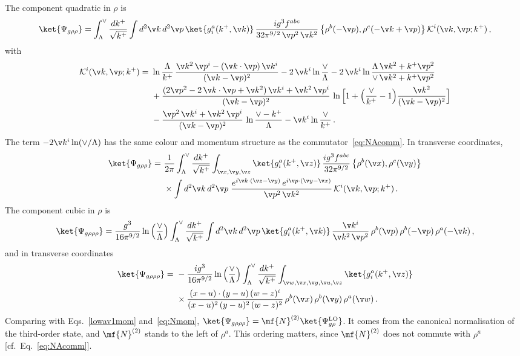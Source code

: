 The component quadratic in $\rho$ is
\begin{align}\label{grhorhomom}
\ket{\Psi_{g\rho\rho}} =\int_{\Lambda}^{\vee}\frac{dk^{+}}{\sqrt{k^{+}}}\int d^{2}\v k\,d^{2}\v p\,\ket{g^{a}_{i}(k^{+},\v k)}\,
\frac{ig^{3}f^{abc}}{32\pi^{9/2}\,\v p^{2}\,\v k^{2}}\,\big\{\rho^{b}(-\v p),\rho^{c}(-\v k+\v p)\big\}\,
\mathcal{K}^{i}(\v k,\v p;k^{+})\,,
\end{align}
with
\begin{align}\label{grhorhokernel}
\mathcal{K}^{i}(\v k,\v p;k^{+})=\ &\ln\frac{\Lambda}{k^{+}}\,\frac{\v k^{2}\,\v p^{i}-(\v k\cdot\v p)\,\v k^{i}}{(\v k-\v p)^{2}}
-2\,\v k^{i}\ln\frac{\vee}{\Lambda}-2\,\v k^{i}\ln\frac{\Lambda\,\v k^{2}+k^{+}\v p^{2}}{\vee\,\v k^{2}+k^{+}\v p^{2}}\notag\\
&+\frac{(2\v p^{2}-2\,\v k\cdot\v p+\v k^{2})\,\v k^{i}+\v k^{2}\,\v p^{i}}{(\v k-\v p)^{2}}\,
\ln\Big[1+\Big(\frac{\vee}{k^{+}}-1\Big)\frac{\v k^{2}}{(\v k-\v p)^{2}}\Big]\notag\\
&-\frac{\v p^{2}\,\v k^{i}+\v k^{2}\,\v p^{i}}{(\v k-\v p)^{2}}\,\ln\frac{\vee-k^{+}}{\Lambda}-\v k^{i}\ln\frac{\vee}{k^{+}}\,.
\end{align}
The term $-2\v k^{i}\ln(\vee/\Lambda)$ has the same colour and momentum structure as the
commutator~\eqref{eq:NAcomm}. In transverse coordinates,
\begin{align}\label{grhorhopos}
\ket{\Psi_{g\rho\rho}} =\ &\frac{1}{2\pi}\int_{\Lambda}^{\vee}\frac{dk^{+}}{\sqrt{k^{+}}}\int_{\v x,\v y,\v z}
\ket{g^{a}_{i}(k^{+},\v z)}\,\frac{ig^{3}f^{abc}}{32\pi^{9/2}}\,\big\{\rho^{b}(\v x),\rho^{c}(\v y)\big\}\notag\\
&\times\int d^{2}\v k\,d^{2}\v p\;\frac{e^{i\v k\cdot(\v z-\v y)}\,e^{i\v p\cdot(\v y-\v x)}}{\v p^{2}\,\v k^{2}}\,
\mathcal{K}^{i}(\v k,\v p;k^{+})\,.
\end{align}
The component cubic in $\rho$ is
\begin{align}\label{3rhosmom}
\ket{\Psi_{g\rho\rho\rho}} =\frac{g^{3}}{16\pi^{9/2}}\ln\Big(\frac{\vee}{\Lambda}\Big)\int_{\Lambda}^{\vee}\frac{dk^{+}}{\sqrt{k^{+}}}
\int d^{2}\v k\,d^{2}\v p\,\ket{g^{a}_{i}(k^{+},\v k)}\,\frac{\v k^{i}}{\v k^{2}\,\v p^{2}}\,
\rho^{b}(\v p)\,\rho^{b}(-\v p)\,\rho^{a}(-\v k)\,,
\end{align}
and in transverse coordinates
\begin{align}\label{3rhospos}
\ket{\Psi_{g\rho\rho\rho}} =\ &-\frac{ig^{3}}{16\pi^{9/2}}\ln\Big(\frac{\vee}{\Lambda}\Big)\int_{\Lambda}^{\vee}\frac{dk^{+}}{\sqrt{k^{+}}}
\int_{\v w,\v x,\v y,\v u,\v z}\ket{g^{a}_{i}(k^{+},\v z)}\notag\\
&\times\frac{(x-u)\cdot(y-u)\,(w-z)^{i}}{(x-u)^{2}\,(y-u)^{2}\,(w-z)^{2}}\,\rho^{b}(\v x)\,\rho^{b}(\v y)\,\rho^{a}(\v w)\,.
\end{align}
Comparing with Eqs.~\eqref{lowav1mom} and~\eqref{eq:Nmom}, $\ket{\Psi_{g\rho\rho\rho}}=\mf{N}^{(2)}\ket{\Psi^{\rm LO}_{g\rho}}$. It
comes from the canonical normalisation of the third-order state, and $\mf{N}^{(2)}$ stands to the left of
$\rho^{a}$. This ordering matters, since $\mf{N}^{(2)}$ does not commute with $\rho^{a}$
[cf.\ Eq.~\eqref{eq:NAcomm}].

